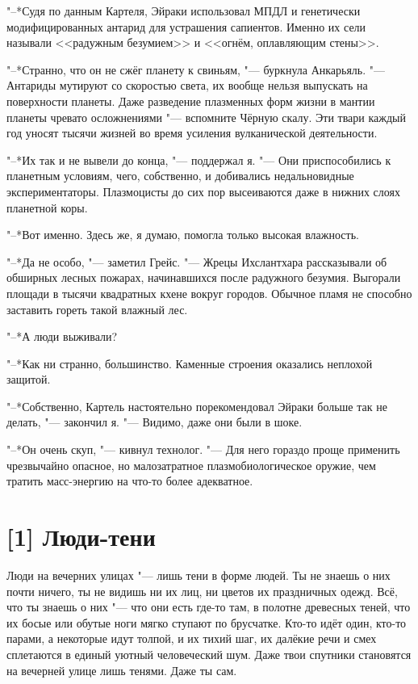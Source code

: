 "--*Судя по данным Картеля, Эйраки использовал МПДЛ и генетически модифицированных антарид для устрашения сапиентов.
Именно их сели называли <<радужным безумием>> и <<огнём, оплавляющим стены>>.

"--*Странно, что он не сжёг планету к свиньям, "--- буркнула Анкарьяль.
"--- Антариды мутируют со скоростью света, их вообще нельзя выпускать на поверхности планеты.
Даже разведение плазменных форм жизни в мантии планеты чревато осложнениями "--- вспомните Чёрную скалу.
Эти твари каждый год уносят тысячи жизней во время усиления вулканической деятельности.

"--*Их так и не вывели до конца, "--- поддержал я.
"--- Они приспособились к планетным условиям, чего, собственно, и добивались недальновидные экспериментаторы.
Плазмоцисты до сих пор высеиваются даже в нижних слоях планетной коры.

"--*Вот именно.
Здесь же, я думаю, помогла только высокая влажность.

"--*Да не особо, "--- заметил Грейс.
"--- Жрецы Ихслантхара рассказывали об обширных лесных пожарах, начинавшихся после радужного безумия.
Выгорали площади в тысячи квадратных кхене вокруг городов.
Обычное пламя не способно заставить гореть такой влажный лес.

"--*А люди выживали?

"--*Как ни странно, большинство.
Каменные строения оказались неплохой защитой.

"--*Собственно, Картель настоятельно порекомендовал Эйраки больше так не делать, "--- закончил я.
"--- Видимо, даже они были в шоке.

"--*Он очень скуп, "--- кивнул технолог.
"--- Для него гораздо проще применить чрезвычайно опасное, но малозатратное плазмобиологическое оружие, чем тратить масс-энергию на что-то более адекватное.

\section{[1] Люди-тени}

Люди на вечерних улицах "--- лишь тени в форме людей.
Ты не знаешь о них почти ничего, ты не видишь ни их лиц, ни цветов их праздничных одежд.
Всё, что ты знаешь о них "--- что они есть где-то там, в полотне древесных теней, что их босые или обутые ноги мягко ступают по брусчатке.
Кто-то идёт один, кто-то парами, а некоторые идут толпой, и их тихий шаг, их далёкие речи и смех сплетаются в единый уютный человеческий шум.
Даже твои спутники становятся на вечерней улице лишь тенями.
Даже ты сам.

